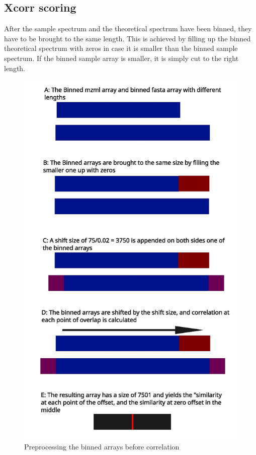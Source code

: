 \documentclass[11pt]{article}
\begin{document}
\subsection{Xcorr scoring}
After the sample spectrum and the theoretical spectrum have been binned, they have to be brought to the same length. This is achieved by filling up the binned theoretical spectrum with zeros in case it is smaller than the binned sample spectrum. If the binned sample array is smaller, it is simply cut to the right length. 
\begin{figure}
\includegraphics[width=\linewidth]{figs/crosscorr.jpg} 
\caption{Preprocessing the binned arrays before correlation}
\label{fig:corr}
\end{figure}
\end{document}
